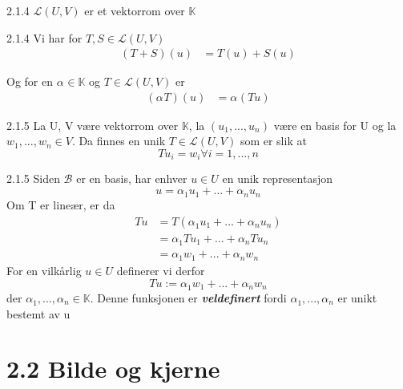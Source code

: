 \documentclass[a4paper,norsk]{article}
\begin{document}
\begin{propositionbox}{2.1.4}{}
$ \mathcal{L} \left( U, V \right)  $ er et vektorrom over $ \mathbb{K} $ 

\begin{proofbox}{2.1.4}{}
Vi har for $ T, S \in \mathcal{L} \left( U, V \right)  $
\begin{align*}
  \left( T + S \right) \left( u \right) &= T \left( u \right) + S \left( u \right) 
\end{align*}

Og for en $ \alpha_{}^{} \in  \mathbb{K} $ og $ T \in \mathcal{L} \left( U, V \right)  $ er 
\begin{align*}
  \left( \alpha_{}^{} T \right) \left( u \right) &= \alpha_{}^{} \left( Tu \right) 
\end{align*}
\end{proofbox}
\end{propositionbox}


\begin{propositionbox}{2.1.5}{}
La U, V være vektorrom over $ \mathbb{K} $, la $ \left( u_1, ..., u_n \right)  $ være en basis for U og la $ w_1, ..., w_n \in V $. Da finnes en unik $ T \in \mathcal{L} \left( U, V \right)  $ som er slik at
\[
    Tu_i = w_i \forall i = 1, ..., n
\]
\begin{proofbox}{2.1.5}{}
Siden $ \mathcal{B} $ er en basis, har enhver $ u \in  U $ en unik representasjon
\[
    u = \alpha_{1}^{} u_1 + ... + \alpha_{n}^{} u_n
\]
Om T er lineær, er da
\begin{align*}
  Tu &= T \left(  \alpha_{1}^{} u_1 + ... + \alpha_{n}^{} u_n \right) \\
  &= \alpha_{1}^{} T u_1 + ... + \alpha_{n}^{} T u_n \\
  &= \alpha_{1}^{} w_1 + ... + \alpha_{n}^{} w_n
\end{align*}
For en vilkårlig $ u \in U $ definerer vi derfor 
\[
    Tu := \alpha_{1}^{} w_1 + ... + \alpha_{n}^{} w_n
\]
der $ \alpha_{1}^{} , ..., \alpha_{n}^{} \in  \mathbb{K} $. Denne funksjonen er \textbf{\textit{veldefinert}} fordi $ \alpha_{1}^{} , ..., \alpha_{n}^{}  $ er unikt bestemt av u


\end{proofbox}
\end{propositionbox}

\section*{2.2 Bilde og kjerne}
\end{document}
